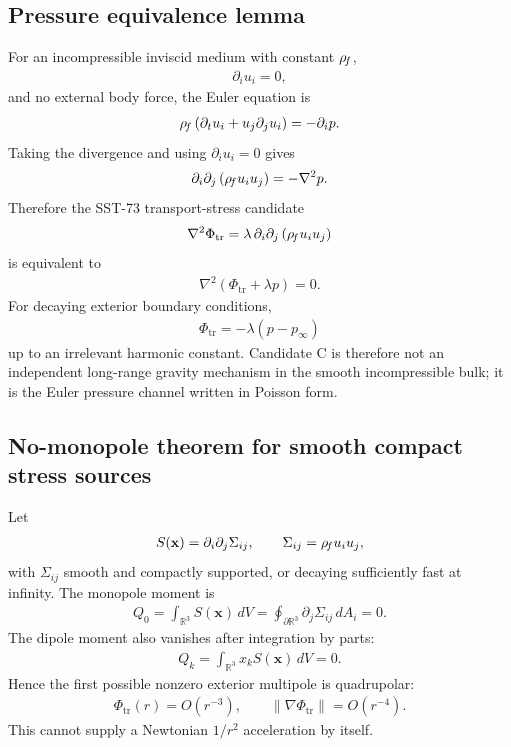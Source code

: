 \subsection{Pressure equivalence lemma}
For an incompressible inviscid medium with constant \(\rho_{\!f}\),
\begin{align}
    \partial_i u_i=0,
\end{align}
and no external body force, the Euler equation is
\begin{align}
    \rho_{\!f}\left(\partial_t u_i + u_j\partial_j u_i\right)
    =
    -\partial_i p .
\end{align}
Taking the divergence and using \(\partial_i u_i=0\) gives
\begin{align}
    \partial_i\partial_j\left(\rho_{\!f} u_i u_j\right)
    =
    -\nabla^2p .
    \label{eq:rt_pressure_equivalence_euler_identity}
\end{align}
Therefore the SST-73 transport-stress candidate
\begin{align}
    \nabla^2\Phi_{\mathrm{tr}}
    =
    \lambda\,\partial_i\partial_j\left(\rho_{\!f} u_i u_j\right)
\end{align}
is equivalent to
\begin{align}
    \nabla^2\left(\Phi_{\mathrm{tr}}+\lambda p\right)=0 .
\end{align}
For decaying exterior boundary conditions,
\begin{align}
    \boxed{
    \Phi_{\mathrm{tr}}
    =
    -\lambda\left(p-p_\infty\right)
    }
    \label{eq:rt_transport_pressure_equivalence}
\end{align}
up to an irrelevant harmonic constant.  Candidate C is therefore not an
independent long-range gravity mechanism in the smooth incompressible bulk; it
is the Euler pressure channel written in Poisson form.

\subsection{No-monopole theorem for smooth compact stress sources}
Let
\begin{align}
    S(\mathbf{x})
    =
    \partial_i\partial_j\Sigma_{ij},
    \qquad
    \Sigma_{ij}=\rho_{\!f} u_i u_j,
\end{align}
with \(\Sigma_{ij}\) smooth and compactly supported, or decaying sufficiently
fast at infinity.  The monopole moment is
\begin{align}
    Q_0
    =
    \int_{\mathbb{R}^3}S(\mathbf{x})\,dV
    =
    \oint_{\partial\mathbb{R}^3}\partial_j\Sigma_{ij}\,dA_i
    =0 .
\end{align}
The dipole moment also vanishes after integration by parts:
\begin{align}
    Q_k
    =
    \int_{\mathbb{R}^3}x_k S(\mathbf{x})\,dV
    =0 .
\end{align}
Hence the first possible nonzero exterior multipole is quadrupolar:
\begin{align}
    \Phi_{\mathrm{tr}}(r)=O(r^{-3}),
    \qquad
    \lVert\nabla\Phi_{\mathrm{tr}}\rVert=O(r^{-4}).
\end{align}
This cannot supply a Newtonian \(1/r^2\) acceleration by itself.

